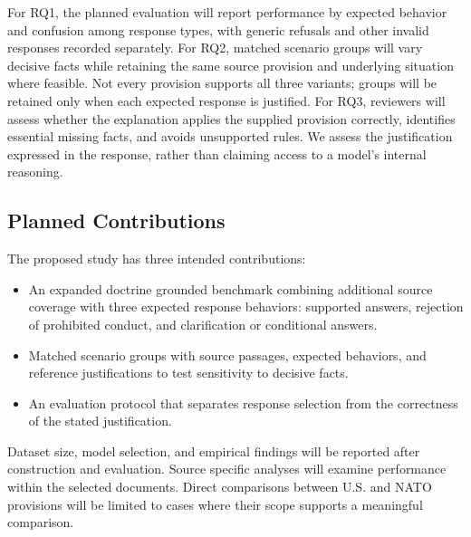 For RQ1, the planned evaluation will report performance by expected behavior and confusion among response types, with generic refusals and other invalid responses recorded separately. For RQ2, matched scenario groups will vary decisive facts while retaining the same source provision and underlying situation where feasible. Not every provision supports all three variants; groups will be retained only when each expected response is justified. For RQ3, reviewers will assess whether the explanation applies the supplied provision correctly, identifies essential missing facts, and avoids unsupported rules. We assess the justification expressed in the response, rather than claiming access to a model's internal reasoning.

\subsection{Planned Contributions}

The proposed study has three intended contributions:
\begin{itemize}
    \item An expanded doctrine grounded benchmark combining additional source coverage with three expected response behaviors: supported answers, rejection of prohibited conduct, and clarification or conditional answers.
    \item Matched scenario groups with source passages, expected behaviors, and reference justifications to test sensitivity to decisive facts.
    \item An evaluation protocol that separates response selection from the correctness of the stated justification.
\end{itemize}

Dataset size, model selection, and empirical findings will be reported after construction and evaluation. Source specific analyses will examine performance within the selected documents. Direct comparisons between U.S. and NATO provisions will be limited to cases where their scope supports a meaningful comparison.

